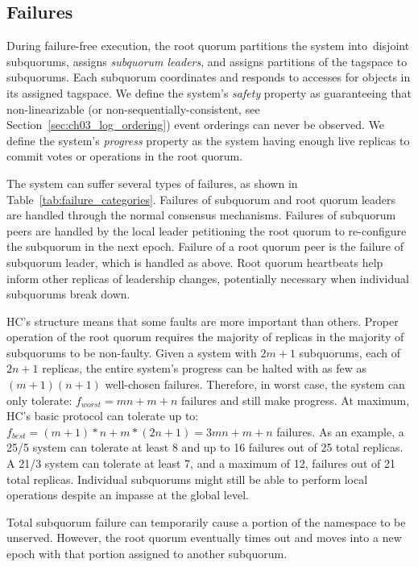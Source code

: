 \subsection{Failures}

During failure-free execution, the root quorum partitions the system into\ disjoint subquorums, assigns \emph{subquorum leaders}, and assigns partitions of the tagspace to subquorums.
Each subquorum coordinates and responds to accesses for objects in its assigned tagspace.
We define the system's \emph{safety} property as guaranteeing that non-linearizable (or non-sequentially-consistent, see Section~\ref{sec:ch03_log_ordering}) event orderings can never be observed.
We define the system's \emph{progress} property as the system having enough live replicas to commit votes or operations in the root quorum.

The system can suffer several types of failures, as shown in Table~\ref{tab:failure_categories}.
Failures of subquorum and root quorum leaders are handled through the normal consensus mechanisms.
Failures of subquorum peers are handled by the local leader petitioning the root quorum to re-configure the subquorum in the next epoch.
Failure of a root quorum peer is the failure of subquorum leader, which is handled as above.
Root quorum heartbeats help inform other replicas of leadership changes, potentially necessary when individual subquorums break down.


HC's structure means that some faults are more important than others.
Proper operation of the root quorum requires the majority of replicas in the majority of subquorums to be non-faulty.
Given a system with $2m+1$ subquorums, each of $2n+1$ replicas, the entire system's progress can be halted with as few as $(m+1)(n+1)$ well-chosen failures.
Therefore, in worst case, the system can only tolerate: $f_{worst}=mn+m+n$ failures and still make progress.
At maximum, HC's basic protocol can tolerate up to: $f_{best} = (m+1)*n + m*(2n+1) = 3mn+m+n$ failures.
As an example, a 25/5 system can tolerate at least 8 and up to 16 failures out of 25 total replicas.
A 21/3 system can tolerate at least 7, and a maximum of 12, failures out of 21 total replicas.
Individual subquorums might still be able to perform local operations despite an impasse at the global level.

Total subquorum failure can temporarily cause a portion of the namespace to be unserved.
However, the root quorum eventually times out and moves into a new epoch with that portion assigned to another subquorum.

